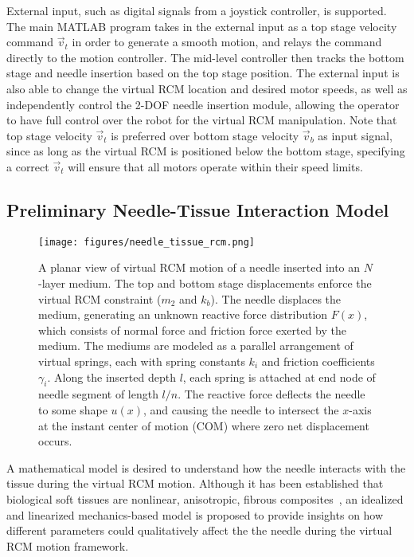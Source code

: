External input, such as digital signals from a joystick controller, is supported. The main MATLAB program takes in the external input as a top stage velocity command $\vec{v}_t$ in order to generate a smooth motion, and relays the command directly to the motion controller. The mid-level controller then tracks the bottom stage and needle insertion based on the top stage position. The external input is also able to change the virtual RCM location and desired motor speeds, as well as independently control the 2-DOF needle insertion module, allowing the operator to have full control over the robot for the virtual RCM manipulation. Note that top stage velocity $\vec{v}_t$ is preferred over bottom stage velocity $\vec{v}_b$ as input signal, since as long as the virtual RCM is positioned below the bottom stage, specifying a correct $\vec{v}_t$ will ensure that all motors operate within their speed limits.

\subsection{Preliminary Needle-Tissue Interaction Model}
\label{sec:chap-2-preliminary-interaction-model}

\begin{figure*}[t]
  \centering
  \texttt{[image: figures/needle\_tissue\_rcm.png]}
  \caption{A planar view of virtual RCM motion of a needle inserted into an $N$-layer medium. The top and bottom stage displacements enforce the virtual RCM constraint ($m_2$ and $k_b$). The needle displaces the medium, generating an unknown reactive force distribution $F(x)$, which consists of normal force and friction force exerted by the medium. The mediums are modeled as a parallel arrangement of virtual springs, each with spring constants $k_i$ and friction coefficients $\gamma_i$. Along the inserted depth $l$, each spring is attached at end node of needle segment of length $l/n$. The reactive force deflects the needle to some shape $u(x)$, and causing the needle to intersect the $x$-axis at the instant center of motion (COM) where zero net displacement occurs.}
  \label{fig:needle_tissue_rcm}
\end{figure*}

A mathematical model is desired to understand how the needle interacts with the tissue during the virtual RCM motion. Although it has been established that biological soft tissues are nonlinear, anisotropic, fibrous composites~\parencite{petersonBiomechanicsPrinciplesApplications2007}, an idealized and linearized mechanics-based model is proposed to provide insights on how different parameters could qualitatively affect the the needle during the virtual RCM motion framework.

